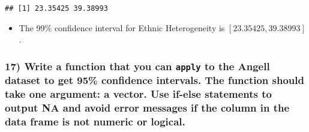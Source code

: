 \documentclass[
  12pt,
]{article}
\providecommand{\tightlist}{%
  \setlength{\itemsep}{0pt}\setlength{\parskip}{0pt}}
\begin{document}
\begin{verbatim}
## [1] 23.35425 39.38993
\end{verbatim}

\begin{itemize}
\tightlist
\item
  The 99\% confidence interval for Ethnic Heterogeneity is
  \([23.35425, 39.38993]\).
\end{itemize}

\hypertarget{write-a-function-that-you-can-apply-to-the-angell-dataset-to-get-95-confidence-intervals.-the-function-should-take-one-argument-a-vector.-use-if-else-statements-to-output-na-and-avoid-error-messages-if-the-column-in-the-data-frame-is-not-numeric-or-logical.}{%
\subsubsection{\texorpdfstring{17) Write a function that you can
\texttt{apply} to the Angell dataset to get 95\% confidence intervals.
The function should take one argument: a vector. Use if-else statements
to output NA and avoid error messages if the column in the data frame is
not numeric or
logical.}{17) Write a function that you can apply to the Angell dataset to get 95\% confidence intervals. The function should take one argument: a vector. Use if-else statements to output NA and avoid error messages if the column in the data frame is not numeric or logical.}}\label{write-a-function-that-you-can-apply-to-the-angell-dataset-to-get-95-confidence-intervals.-the-function-should-take-one-argument-a-vector.-use-if-else-statements-to-output-na-and-avoid-error-messages-if-the-column-in-the-data-frame-is-not-numeric-or-logical.}}
\end{document}
